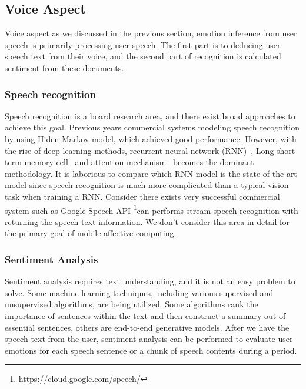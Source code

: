 \subsection{Voice Aspect}\label{subsec:voice-model}

Voice aspect as we discussed in the previous section, emotion inference from user speech is primarily processing user speech. The first part is to deducing user speech text from their voice, and the second part of recognition is calculated sentiment from these documents.

\subsubsection{Speech recognition}

Speech recognition is a board research area, and there exist broad approaches to achieve this goal. Previous years commercial systems modeling speech recognition by using Hiden Markov model, which achieved good performance. However, with the rise of deep learning methods, recurrent neural network (RNN)~\cite{mikolov2010recurrent}, Long-short term memory cell~\cite{hochreiter1997long} and attention mechanism~\cite{google2017} becomes the dominant methodology. It is laborious to compare which RNN model is the state-of-the-art model since speech recognition is much more complicated than a typical vision task when training a RNN. Consider there exists very successful commercial system such as Google Speech API \footnote{\url{https://cloud.google.com/speech/}}can performs stream speech recognition with returning the speech text information. We don't consider this area in detail for the primary goal of mobile affective computing.

\subsubsection{Sentiment Analysis}

Sentiment analysis requires text understanding, and it is not an easy problem to solve. Some machine learning techniques, including various supervised and unsupervised algorithms, are being utilized. Some algorithms rank the importance of sentences within the text and then construct a summary out of essential sentences, others are end-to-end generative models. After we have the speech text from the user, sentiment analysis can be performed to evaluate user emotions for each speech sentence or a chunk of speech contents during a period.

